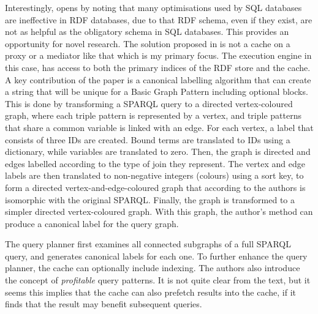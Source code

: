 Interestingly, \cite{papailiou2015graph} opens by noting that many
optimisations used by SQL databases are ineffective in RDF databases,
due to that RDF schema, even if they exist, are not as helpful as the
obligatory schema in SQL databases. This provides an opportunity for
novel research. The solution proposed in \cite{papailiou2015graph}  is not a cache on
a proxy or a mediator like that which is my primary focus. The execution engine
in this case, has access to both the primary indices of the RDF store
and the cache. A key contribution of the paper is a canonical
labelling algorithm that can create a string that will be unique for a
Basic Graph Pattern including optional blocks. This is done by
transforming a SPARQL query to a directed vertex-coloured graph, where
each triple pattern is represented by a vertex, and triple patterns
that share a common variable is linked with an edge. For each vertex,
a label that consists of three IDs are created. Bound terms are
translated to IDs using a dictionary, while variables are translated
to zero. Then, the graph is directed and edges labelled according to
the type of join they represent. The vertex and edge labels are then
translated to non-negative integers (colours) using a sort key, to
form a directed vertex-and-edge-coloured graph that according to the
authors is isomorphic with the original SPARQL. Finally, the graph is
transformed to a simpler directed vertex-coloured graph. With this
graph, the author's method can produce a canonical label for the query
graph.

The query planner first examines all connected subgraphs of a full
SPARQL query, and generates canonical labels for each one. To
further enhance the query planner, the cache can optionally include
indexing. The authors also introduce the concept of
\textit{profitable} query patterns. It is not quite clear from the
text, but it seems this implies that the cache can also prefetch
results into the cache, if it finds that the result may benefit
subsequent queries.


